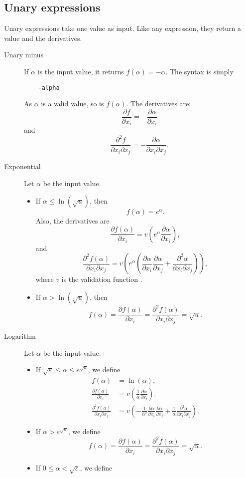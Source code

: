 \documentclass[12pt,a4paper]{article}
\begin{document}
\subsection{Unary expressions}

Unary expressions take one value as input. Like any expression, they return a value and the derivatives.
\begin{description}
\item[Unary minus] If $\alpha$ is the input value, it returns $f(\alpha)=-\alpha$. The syntax is simply
  \begin{lstlisting}
    -alpha
  \end{lstlisting}
  As $\alpha$ is a valid value, so is $f(\alpha)$. The derivatives are:
  \[
  \frac{\partial f}{\partial x_i} = - \frac{\partial \alpha}{\partial x_i}
  \]
  and
  \[
  \frac{\partial^2 f}{\partial x_i \partial x_j} = - \frac{\partial \alpha}{\partial x_i \partial x_j}.
  \]
\item[Exponential] Let $\alpha$ be the input value.
  \begin{itemize}
  \item  If $\alpha \leq \ln(\sqrt{u})$, then
    \[
    f(\alpha)=e^\alpha.
    \]
    Also, the derivatives are
    \[
    \frac{\partial f(\alpha)}{\partial x_i} = v\left(e^\alpha \frac{\partial \alpha}{\partial x_i}\right),
    \]
    and
    \[
    \frac{\partial^2 f(\alpha)}{\partial x_i \partial x_j} = v\left(e^\alpha (\frac{\partial \alpha}{\partial x_i}\frac{\partial \alpha}{\partial x_j} + \frac{\partial^2 \alpha}{\partial x_i \partial x_j})\right),
    \]
    where $v$ is the validation function .
  \item If $\alpha > \ln(\sqrt{u})$, then
    \[
    f(\alpha) = \frac{\partial f(\alpha)}{\partial x_i} = \frac{\partial^2 f(\alpha)}{\partial x_i \partial x_j} = \sqrt{u}.
    \]
  \end{itemize}

\item[Logarithm] Let $\alpha$ be the input value.
  \begin{itemize}
  \item If $\sqrt{\varepsilon} \leq \alpha \leq e^{\sqrt{u}}$, we define
    \begin{align*}
    f(\alpha)& =\ln(\alpha), \\ 
    \frac{\partial f(\alpha)}{\partial x_i} &= v\left(\frac{1}{\alpha} \frac{\partial \alpha}{\partial x_i}\right), \\
    \frac{\partial^2 f(\alpha)}{\partial x_i \partial x_j} &=
    v\left(-\frac{1}{\alpha^{2}}
    \frac{\partial \alpha}{\partial x_i}
    \frac{\partial \alpha}{\partial x_j }
    + \frac{1}{\alpha}
    \frac{\partial^2 \alpha}{\partial x_i \partial x_j}
      \right).
    \end{align*}
  \item If $\alpha > e^{\sqrt{u}}$, we define
    \[
    f(\alpha) = \frac{\partial f(\alpha)}{\partial x_i} = \frac{\partial^2 f(\alpha)}{\partial x_i \partial x_j} = \sqrt{u}.
    \]
  \item If $0 \leq  \alpha < \sqrt{\varepsilon}$, we define
    

\end{itemize}
\end{description}
\end{document}
